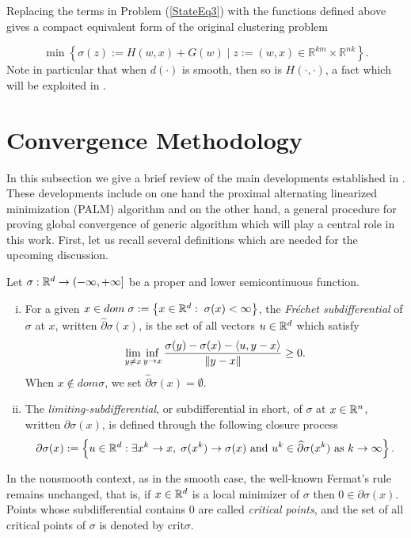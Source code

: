 Replacing the terms in Problem (\ref{StateEq3}) with the functions defined above gives a compact equivalent form of the original clustering problem

\begin{equation}
	\min \left\lbrace \sigma(z) := H(w,x) + G(w) \mid z := (w,x) \in \mathbb{R}^{km} \times \mathbb{R}^{nk} \right\rbrace . \label{StateEq4}
\end{equation}
Note in particular that when $d(\cdot)$ is smooth, then so is $H(\cdot,\cdot)$, a fact which will be exploited in .

\section{Convergence Methodology} \label{State_PALM_Theory}

In this subsection we give a brief review of the main developments established in \cite
{BST2014}. These developments include on one hand the proximal alternating linearized minimization (PALM) algorithm and on the other hand, a general procedure for proving global convergence of generic algorithm which will play a central role in this work. First, let us recall several definitions which are needed for the upcoming discussion.

\begin{definition}[Subdifferentials] \label{subdiff_def}
	Let $\sigma : \mathbb{R}^d \rightarrow (-\infty,+\infty]$ be a proper and lower semicontinuous function.
	\begin{enumerate}[(i)]
		\item For a given $x \in dom\;\sigma := \left\lbrace x \in \mathbb{R}^d : \; \sigma(x) < \infty \right\rbrace$, the \textit{Fr\'echet subdifferential} of $\sigma$ at $x$, written $\widehat{\partial}\sigma(x)$, is the set of all vectors $u \in \mathbb{R}^d$ which satisfy
		\begin{equation*}
			\lim\limits_{y \neq x} \inf\limits_{y \rightarrow x} \frac{\sigma(y) - \sigma(x) - \left\langle u, y-x \right\rangle}{\left\Vert {y-x} \right\Vert} \geq 0.
		\end{equation*}
		When $x \notin dom\sigma$, we set $\widehat{\partial}\sigma(x) = \emptyset$.
		\item The \textit{limiting-subdifferential}, or subdifferential in short, of $\sigma$ at $x \in \mathbb{R}^n$, written $\partial\sigma(x)$, is defined through the following closure process
		\begin{equation*}
			\partial\sigma(x) := \left\lbrace u \in \mathbb{R}^d : \exists x^k \rightarrow x, \; \sigma(x^k)\rightarrow \sigma(x) \text{ and } u^k \in \widehat{\partial}\sigma(x^k) \text{ as } k \rightarrow \infty \right\rbrace.
		\end{equation*}
	\end{enumerate}
\end{definition}
In the nonsmooth context, as in the smooth case, the well-known Fermat's rule remains unchanged, that is, if $x \in \mathbb{R}^d$ is a local minimizer of $\sigma$ then $0 \in \partial\sigma(x)$. Points whose subdifferential contains $0$ are called \textit{critical points}, and the set of all critical points of $\sigma$ is denoted by crit$\sigma$.\medskip

